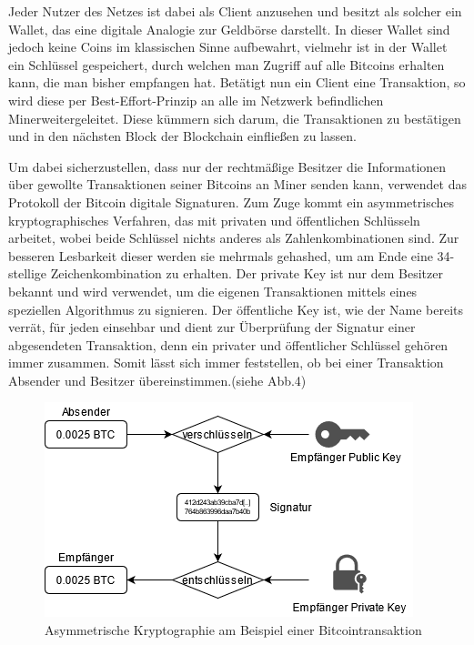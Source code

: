 \documentclass[12pt,oneside]{article}
\begin{document}
Jeder Nutzer des Netzes ist dabei als Client anzusehen und besitzt als solcher ein Wallet, das eine digitale Analogie zur Geldbörse darstellt. In dieser Wallet sind jedoch keine Coins im klassischen Sinne aufbewahrt, vielmehr ist in der Wallet ein Schlüssel gespeichert, durch welchen man Zugriff auf alle Bitcoins erhalten kann, die man bisher empfangen hat. Betätigt nun ein Client eine Transaktion, so wird diese per \glqq Best-Effort\grqq -Prinzip an alle im Netzwerk befindlichen \glqq Miner\grqq  weitergeleitet. Diese kümmern sich darum, die Transaktionen zu bestätigen und in den nächsten Block der Blockchain einfließen zu lassen.

Um dabei sicherzustellen, dass nur der rechtmäßige Besitzer die Informationen über gewollte Transaktionen seiner Bitcoins an Miner senden kann, verwendet das Protokoll der Bitcoin digitale Signaturen. Zum Zuge kommt ein asymmetrisches kryptographisches Verfahren, das mit privaten und öffentlichen Schlüsseln arbeitet, wobei beide Schlüssel nichts anderes als Zahlenkombinationen sind. Zur besseren Lesbarkeit dieser werden sie mehrmals gehashed, um am Ende eine 34-stellige Zeichenkombination zu erhalten. Der private Key ist nur dem Besitzer bekannt und wird verwendet, um die eigenen Transaktionen mittels eines speziellen Algorithmus zu signieren. Der öffentliche Key ist, wie der Name bereits verrät, für jeden einsehbar und dient zur Überprüfung der Signatur einer abgesendeten Transaktion, denn ein privater und öffentlicher Schlüssel gehören immer zusammen. Somit lässt sich immer feststellen, ob bei einer Transaktion Absender und Besitzer übereinstimmen.(siehe Abb.4)
\cite{soeteman2019}\cite{binance}


\begin{figure}[h]
\centering
\includegraphics[scale=0.9]{./images/pubprivkey.png}
\caption{Asymmetrische Kryptographie am Beispiel einer Bitcointransaktion \cite{coincierge}}
\centering
\end{figure}
\end{document}
